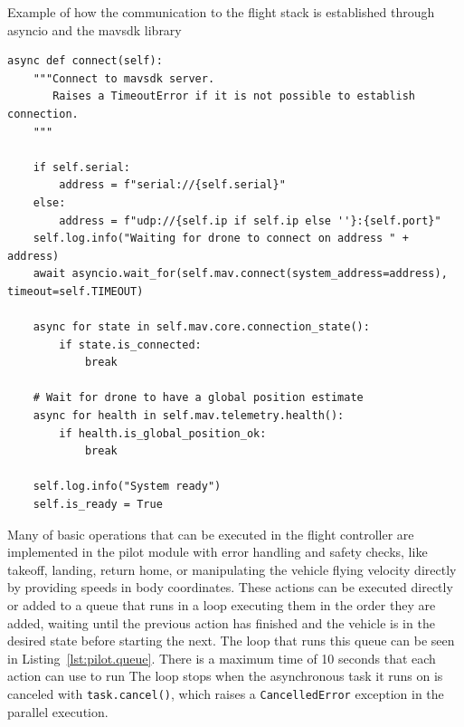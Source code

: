 \begin{listing}[h!]
    \caption{Example of how the communication to the flight stack is established through asyncio and the mavsdk library}{}
    \label{lst:pilot.connect}
    \begin{verbatim}
async def connect(self):
    """Connect to mavsdk server.
       Raises a TimeoutError if it is not possible to establish connection.
    """
    
    if self.serial:
        address = f"serial://{self.serial}"
    else:
        address = f"udp://{self.ip if self.ip else ''}:{self.port}"
    self.log.info("Waiting for drone to connect on address " + address)
    await asyncio.wait_for(self.mav.connect(system_address=address), timeout=self.TIMEOUT)

    async for state in self.mav.core.connection_state():
        if state.is_connected:
            break

    # Wait for drone to have a global position estimate
    async for health in self.mav.telemetry.health():
        if health.is_global_position_ok:
            break
        
    self.log.info("System ready")
    self.is_ready = True
    \end{verbatim}
\end{listing}

Many of basic operations that can be executed in the flight controller are implemented in the pilot module with error handling and safety checks, like takeoff, landing, return home, or manipulating the vehicle flying velocity directly by providing speeds in body coordinates.
These actions can be executed directly or added to a queue that runs in a loop executing them in the order they are added, waiting until the previous action has finished and the vehicle is in the desired state before starting the next.
The loop that runs this queue can be seen in Listing~\ref{lst:pilot.queue}.
There is a maximum time of 10 seconds that each action can use to run
The loop stops when the asynchronous task it runs on is canceled with \texttt{task.cancel()}, which raises a \texttt{CancelledError} exception in the parallel execution.

